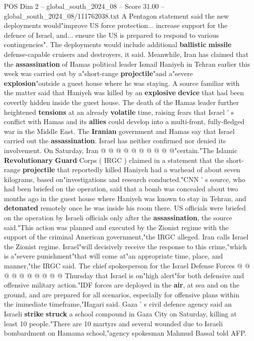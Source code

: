 \begin{textsample}{POS Dim 2 – global\_south\_2024\_08 – Score 31.00 – global\_south\_2024\_08/111762038.txt}
A Pentagon statement said the new deployments would"improve US force protection... increase support for the defence of Israel, and... ensure the US is prepared to respond to various contingencies".
The deployments would include additional \textbf{ballistic} \textbf{missile} defense-capable cruisers and destroyers, it said.
Meanwhile, Iran has claimed that the \textbf{assassination} of Hamas political leader Ismail Haniyeh in Tehran earlier this week was carried out by a"short-range \textbf{projectile}"and a"severe \textbf{explosion}"outside a guest house where he was staying.
A source familiar with the matter said that Haniyeh was killed by an \textbf{explosive} \textbf{device} that had been covertly hidden inside the guest house.
The death of the Hamas leader further heightened \textbf{tensions} at an already \textbf{volatile} time, raising fears that Israel ' s conflict with Hamas and its \textbf{allies} could develop into a multi-front, fully-fledged war in the Middle East.
The \textbf{Iranian} government and Hamas say that Israel carried out the \textbf{assassination}.
Israel has neither confirmed nor denied its involvement.
On Saturday, Iran @ @ @ @ @ @ @ @ @ @"certain."The Islamic \textbf{Revolutionary} \textbf{Guard} Corps ( IRGC ) claimed in a statement that the short-range \textbf{projectile} that reportedly killed Haniyeh had a warhead of about seven kilograms, based on"investigations and research conducted."CNN ' s source, who had been briefed on the operation, said that a bomb was concealed about two months ago in the guest house where Haniyeh was known to stay in Tehran, and \textbf{detonated} remotely once he was inside his room there.
US officials were briefed on the operation by Israeli officials only after the \textbf{assassination}, the source said."This action was planned and executed by the Zionist regime with the support of the criminal American government,"the IRGC alleged.
Iran calls Israel the Zionist regime.
Israel"will decisively receive the response to this crime,"which is a"severe punishment"that will come at"an appropriate time, place, and manner,"the IRGC said.
The chief spokesperson for the Israel Defense Forces @ @ @ @ @ @ @ @ @ @ Thursday that Israel is on"high alert"for both defensive and offensive military action."IDF forces are deployed in the \textbf{air}, at sea and on the ground, and are prepared for all scenarios, especially for offensive plans within the immediate timeframe,"Hagari said.
Gaza ' s civil defence agency said an Israeli \textbf{strike} \textbf{struck} a school compound in Gaza City on Saturday, killing at least 10 people."There are 10 martyrs and several wounded due to Israeli bombardment on Hamama school,"agency spokesman Mahmud Bassal told AFP.

\end{textsample}

